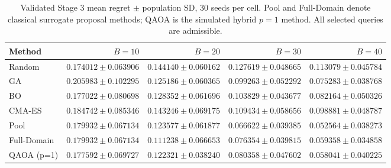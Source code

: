 \begin{table}[htbp]\centering
\caption{Validated Stage 3 mean regret $\pm$ population SD, 30 seeds per cell. Pool and Full-Domain denote classical surrogate proposal methods; QAOA is the simulated hybrid $p=1$ method. All selected queries are admissible.}\label{tab:s3}
\scriptsize
\setlength{\tabcolsep}{4pt}
\begin{tabular}{lrrrr}\toprule
Method & $B=10$ & $B=20$ & $B=30$ & $B=40$ \\ \midrule
Random & $0.174012\pm0.063906$ & $0.144140\pm0.060162$ & $0.127619\pm0.048665$ & $0.113079\pm0.045784$ \\
GA & $0.205983\pm0.102295$ & $0.125186\pm0.060365$ & $0.099263\pm0.052292$ & $0.075283\pm0.038768$ \\
BO & $0.177022\pm0.080698$ & $0.128352\pm0.061696$ & $0.103829\pm0.043677$ & $0.082164\pm0.050326$ \\
CMA-ES & $0.184742\pm0.085346$ & $0.143246\pm0.069175$ & $0.109434\pm0.058656$ & $0.098881\pm0.048787$ \\
Pool & $0.179932\pm0.067134$ & $0.123577\pm0.061877$ & $0.066622\pm0.039385$ & $0.052564\pm0.038273$ \\
Full-Domain & $0.179932\pm0.067134$ & $0.111238\pm0.066653$ & $0.076354\pm0.039815$ & $0.059358\pm0.034858$ \\
QAOA (p=1) & $0.177592\pm0.069727$ & $0.122321\pm0.038240$ & $0.080358\pm0.047602$ & $0.058041\pm0.040225$ \\
\bottomrule\end{tabular}
\end{table}
